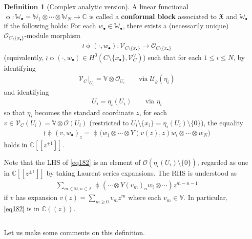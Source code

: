 \documentclass[12pt,a4paper,notitlepage]{article}
\theoremstyle{definition}
\newtheorem{df}{Definition}[section]
\theoremstyle{plain}
\newcommand{\fk}{\mathfrak}
\newcommand{\mc}{\mathcal}
\newcommand{\scr}{\mathscr}
\newcommand{\blt}{\bullet}
\newcommand{\Vbb}{\mathbb V}
\newcommand{\Wbb}{\mathbb W}
\newcommand{\Cbb}{\mathbb C}
\newcommand{\Nbb}{\mathbb N}
\newcommand{\Zbb}{\mathbb Z}
\numberwithin{equation}{section}
\begin{document}
\begin{df}[Complex analytic version]\label{lb103}
A linear functional $\upphi:\Wbb_\blt=\Wbb_1\otimes\cdots\otimes\Wbb_N\rightarrow\Cbb$ is called a \textbf{conformal block} associated to $\fk X$ and $\Wbb_\blt$ if the following holds: For each $w_\blt\in\Wbb_\blt$, there exists a (necessarily unique) $\scr O_{C\setminus\{x_\blt\}}$-module morphism
\begin{align*}
\wr\upphi(\cdot,w_\blt):\scr V_{C\setminus\{x_\blt\}}\rightarrow\scr O_{C\setminus\{x_\blt\}}
\end{align*}
(equivalently,  $\wr\upphi(\cdot,w_\blt)\in H^0(C\setminus\{x_\blt\},\scr V_C^\vee)$) such that  for each $1\leq i\leq N$, by identifying
\begin{align}
\scr V_C|_{U_i}=\Vbb\otimes\scr O_{U_i}\qquad\text{via }\mc U_\varrho(\eta_i)\label{eq186}
\end{align}
and identifying
\begin{align}
U_i=\eta_i(U_i)\qquad\text{via }\eta_i	\label{eq187}
\end{align}
so that $\eta_i$ becomes the standard coordinate $z$, for each $v\in \scr V_C(U_i)=\Vbb\otimes\scr O(U_i)$ (restricted to $U_i\setminus\{x_i\}=\eta_i(U_i)\setminus\{0\}$), the equality
\begin{align}
\wr\upphi(v,w_\blt)_z=\upphi\big(w_1\otimes\cdots\otimes Y(v(z),z)w_i\otimes\cdots\otimes w_N\big) \label{eq182}
\end{align}
holds in $\Cbb[[z^{\pm1}]]$. \hfill\qedsymbol
\end{df}


Note that the LHS of \eqref{eq182} is an element of $\scr O(\eta_i(U_i)\setminus\{0\})$, regarded as one in $\Cbb[[z^{\pm1}]]$ by taking Laurent series expansions. The RHS is understood as
\begin{align*}
\sum_{m\in\Nbb,n\in\Zbb}\upphi(\cdots \otimes Y(v_m)_nw_i\otimes\cdots)z^{m-n-1}	
\end{align*}
if $v$ has expansion $v(z)=\sum_{m\geq 0}v_mz^m$ where each $v_m\in\Vbb$. In particular, \eqref{eq182} is in $\Cbb((z))$. 









\subsection{}


Let us make some comments on this definition.
\end{document}
